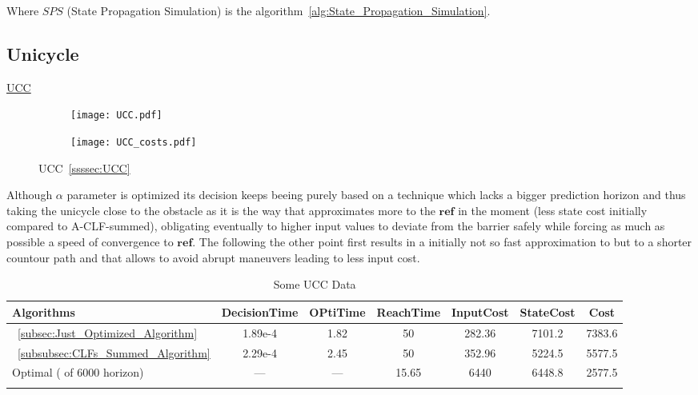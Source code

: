 Where \(SPS\) (State Propagation Simulation) is the algorithm~\ref{alg:State_Propagation_Simulation}.\\



\subsection{Unicycle}
\label{subsec:unicycle_experiments}


\underline{UCC}
\label{ssssec:UCC_experiment} %


\begin{figure}[htbp]
  \begin{subfigure}{0.5\textwidth}
    \centering
    \texttt{[image: UCC.pdf]}
  \label{fig:UCC_CostEvol}
  \end{subfigure}
  \begin{subfigure}{0.6\textwidth}
    \centering
    \texttt{[image: UCC\_costs.pdf]}
  \label{fig:UCC_trajectory}
  \end{subfigure}
  \caption{UCC~\ref{ssssec:UCC}}
\label{fig:UCCTrajectory_and_CostEvol}
\end{figure}


Although  \(\alpha\) parameter is optimized its decision keeps beeing purely based on a  technique which lacks a bigger prediction horizon and thus taking the unicycle close to the obstacle as it is the way that approximates more to the \(\mathbf{ref}\) in the moment (less state cost initially compared to A-CLF-summed), obligating eventually to higher input values to deviate from the barrier safely while forcing as much as possible a speed of convergence to \(\mathbf{ref}\).  The  following the other point first results in a initially not so fast approximation to \txtref but to a shorter countour path and that allows to avoid abrupt maneuvers leading to less input cost.  

 \newpage %


  \bgroup
 \begin{xltabular}{\textwidth}{|l|cccccc|}
   \toprule
   Algorithms   & DecisionTime & OPtiTime & ReachTime  & InputCost   & StateCost & Cost           \\
   \midrule
    ~\ref{subsec:Just_Optimized_Algorithm}           & 1.89e-4 & 1.82 & 50 & 282.36 & 7101.2 & 7383.6 \\
    ~\ref{subsubsec:CLFs_Summed_Algorithm}        & 2.29e-4 & 2.45 & 50 & 352.96 & 5224.5 & 5577.5 \\
    Optimal ( of 6000 horizon)                        & ---     & ---  & 15.65  & 6440  & 6448.8 & 2577.5 \\
    \midrule
    \caption{Some UCC Data}
    \label{tab:Some_UCC_Data}\\
   \end{xltabular}
 \egroup

